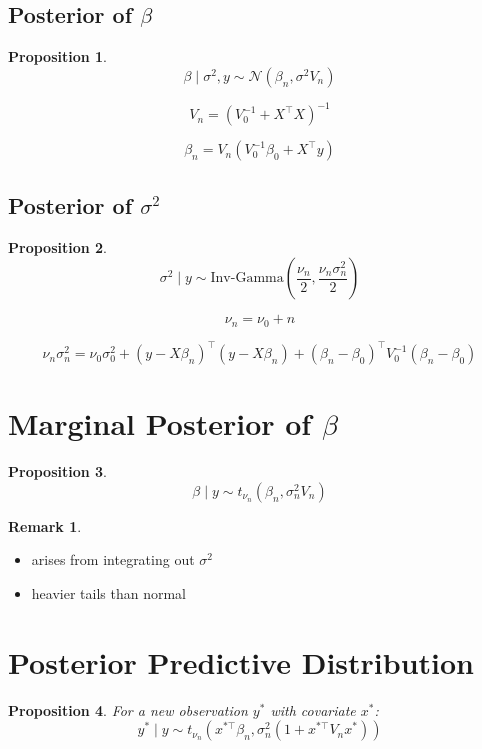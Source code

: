 \documentclass[12pt,oneside]{book}
\numberwithin{equation}{section}
\theoremstyle{definition}
\newtheorem{remark}{Remark}[section]
\theoremstyle{plain}
\newtheorem{proposition}{Proposition}[section]
\theoremstyle{remark}
\newcommand{\Normal}{\mathcal{N}}
\begin{document}
\subsection{Posterior of $\beta$}

\begin{proposition}
$$
\beta \mid \sigma^2, y
\sim
\Normal(\beta_n, \sigma^2 V_n)
$$

$$
V_n = (V_0^{-1} + X^\top X)^{-1}
$$

$$
\beta_n =
V_n (V_0^{-1}\beta_0 + X^\top y)
$$
\end{proposition}

\subsection{Posterior of $\sigma^2$}

\begin{proposition}
$$
\sigma^2 \mid y
\sim
\text{Inv-Gamma}\left(\frac{\nu_n}{2}, \frac{\nu_n \sigma_n^2}{2}\right)
$$

$$
\nu_n = \nu_0 + n
$$

$$
\nu_n \sigma_n^2 =
\nu_0 \sigma_0^2
+
(y - X\beta_n)^\top (y - X\beta_n)
+
(\beta_n - \beta_0)^\top V_0^{-1} (\beta_n - \beta_0)
$$
\end{proposition}

\section{Marginal Posterior of $\beta$}

\begin{proposition}
$$
\beta \mid y \sim t_{\nu_n}(\beta_n, \sigma_n^2 V_n)
$$
\end{proposition}

\begin{remark}
\begin{itemize}
\item arises from integrating out $\sigma^2$
\item heavier tails than normal
\end{itemize}
\end{remark}

\section{Posterior Predictive Distribution}

\begin{proposition}
For a new observation $y^\ast$ with covariate $x^\ast$:
$$
y^\ast \mid y
\sim
t_{\nu_n}
\left(
x^{\ast \top} \beta_n,
\sigma_n^2 (1 + x^{\ast \top} V_n x^\ast)
\right)
$$
\end{proposition}
\end{document}
